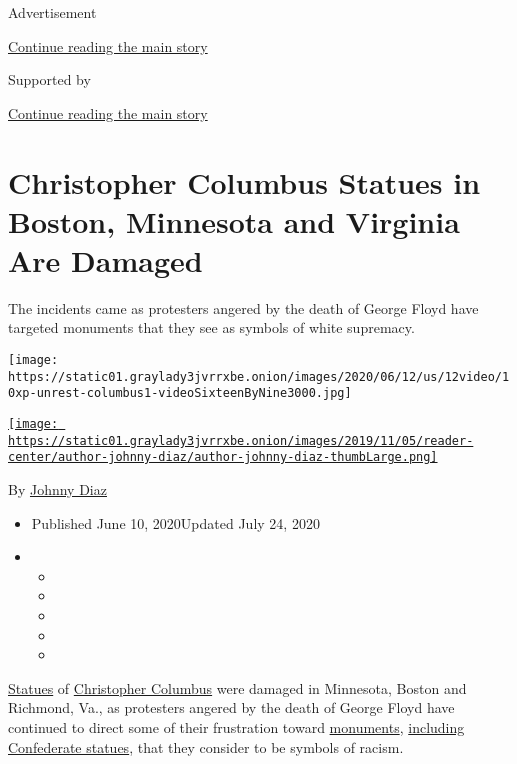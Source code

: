 Advertisement

\protect\hyperlink{after-top}{Continue reading the main story}

Supported by

\protect\hyperlink{after-sponsor}{Continue reading the main story}

\hypertarget{christopher-columbus-statues-in-boston-minnesota-and-virginia-are-damaged}{%
\section{Christopher Columbus Statues in Boston, Minnesota and Virginia
Are
Damaged}\label{christopher-columbus-statues-in-boston-minnesota-and-virginia-are-damaged}}

The incidents came as protesters angered by the death of George Floyd
have targeted monuments that they see as symbols of white supremacy.

\texttt{[image: https://static01.graylady3jvrrxbe.onion/images/2020/06/12/us/12video/10xp-unrest-columbus1-videoSixteenByNine3000.jpg]}

\href{https://www.nytimes3xbfgragh.onion/by/johnny-diaz}{\texttt{[image: https://static01.graylady3jvrrxbe.onion/images/2019/11/05/reader-center/author-johnny-diaz/author-johnny-diaz-thumbLarge.png]}}

By \href{https://www.nytimes3xbfgragh.onion/by/johnny-diaz}{Johnny Diaz}

\begin{itemize}
\item
  Published June 10, 2020Updated July 24, 2020
\item
  \begin{itemize}
  \item
  \item
  \item
  \item
  \item
  \end{itemize}
\end{itemize}

\href{https://www.nytimes3xbfgragh.onion/2020/06/11/us/Jefferson-Davis-Statue-Richmond.html}{Statues}
of
\href{https://www.nytimes3xbfgragh.onion/2020/07/24/us/christopher-columbus-chicago.html}{Christopher
Columbus} were damaged in Minnesota, Boston and Richmond, Va., as
protesters angered by the death of George Floyd have continued to direct
some of their frustration toward
\href{https://www.nytimes3xbfgragh.onion/2020/06/11/us/Jefferson-Davis-Statue-Richmond.html}{monuments},
\href{https://www.nytimes3xbfgragh.onion/2020/06/03/us/confederate-statues-george-floyd.html}{including
Confederate statues}, that they consider to be symbols of racism.


